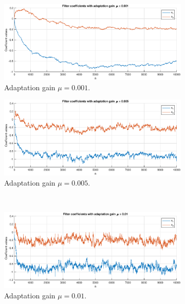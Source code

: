 \begin{figure}[H]
\centering
\begin{subfigure}{.45\textwidth}
  \centering
  \includegraphics[width=\linewidth]{assignment4figs/armu0001.eps}
  \caption{Adaptation gain $\mu = 0.001$.}
\end{subfigure}
\begin{subfigure}{.45\textwidth}
  \centering
  \includegraphics[width=\linewidth]{assignment4figs/armu0005.eps} 
  \caption{Adaptation gain $\mu = 0.005$.}
\end{subfigure}\\
\begin{subfigure}{.45\textwidth}
  \centering
  \includegraphics[width=\linewidth]{assignment4figs/armu001.eps} 
  \caption{Adaptation gain $\mu = 0.01$.}
\end{subfigure}
\begin{subfigure}{.45\textwidth}

\end{subfigure}
\end{figure}
